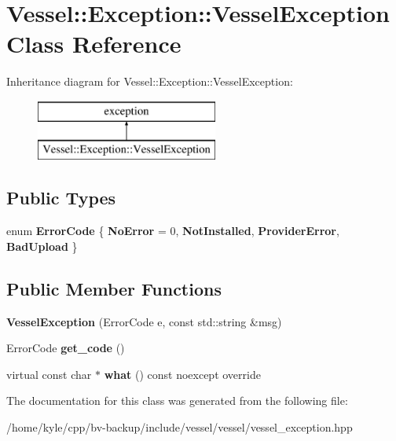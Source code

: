\hypertarget{class_vessel_1_1_exception_1_1_vessel_exception}{}\section{Vessel\+:\+:Exception\+:\+:Vessel\+Exception Class Reference}
\label{class_vessel_1_1_exception_1_1_vessel_exception}
Inheritance diagram for Vessel\+:\+:Exception\+:\+:Vessel\+Exception\+:\begin{figure}[H]
\begin{center}
\leavevmode
\includegraphics[height=2.000000cm]{class_vessel_1_1_exception_1_1_vessel_exception}
\end{center}
\end{figure}
\subsection*{Public Types}
\begin{DoxyCompactItemize}
\item 
\mbox{\label{class_vessel_1_1_exception_1_1_vessel_exception_a5457467e292ffcdd46a30131315c6c0c}} 
enum {\bfseries Error\+Code} \{ {\bfseries No\+Error} = 0, 
{\bfseries Not\+Installed}, 
{\bfseries Provider\+Error}, 
{\bfseries Bad\+Upload}
 \}
\end{DoxyCompactItemize}
\subsection*{Public Member Functions}
\begin{DoxyCompactItemize}
\item 
\mbox{\label{class_vessel_1_1_exception_1_1_vessel_exception_afa4dbc0e78bd83c75a7628ad082a1b64}} 
{\bfseries Vessel\+Exception} (Error\+Code e, const std\+::string \&msg)
\item 
\mbox{\label{class_vessel_1_1_exception_1_1_vessel_exception_a794da64632d4c4898bea4d2ab7cb4944}} 
Error\+Code {\bfseries get\+\_\+code} ()
\item 
\mbox{\label{class_vessel_1_1_exception_1_1_vessel_exception_acb457998178a3e47c7798eae0fc2e92a}} 
virtual const char $\ast$ {\bfseries what} () const noexcept override
\end{DoxyCompactItemize}


The documentation for this class was generated from the following file\+:\begin{DoxyCompactItemize}
\item 
/home/kyle/cpp/bv-\/backup/include/vessel/vessel/vessel\+\_\+exception.\+hpp\end{DoxyCompactItemize}
